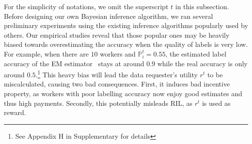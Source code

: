 
For the simplicity of notations, we omit the superscript $t$ in this subsection. 
Before designing our own Bayesian inference algorithm, we ran several preliminary experiments using the existing inference algorithms popularly used by others. Our empirical studies reveal that those popular ones may be heavily biased towards overestimating the accuracy when the quality of labels is very low. For example, when there are $10$ workers and $\mathbb{P}^t_i=0.55$, the estimated label accuracy of the EM estimator~\cite{dawid1979maximum,raykar2010learning} stays at around $0.9$ while the real accuracy is only around $0.5$.\footnote{See Appendix H in Supplementary for details} This heavy bias will lead the data requester's utility $r^t$ to be miscalculated, causing two bad consequences. First, it induces bad incentive property, as workers with poor labelling accuracy now enjoy good estimates and thus high payments. Secondly, this potentially misleads RIL, as $r^t$ is used as reward. 

